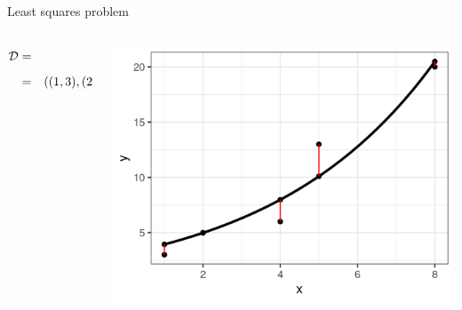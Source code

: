 \documentclass[11pt,compress,t,notes=noshow, xcolor=table]{beamer}
\begin{document}
\begin{vbframe}{Least squares problem}
\begin{columns}
\begin{column}{0.55\textwidth}
\begin{footnotesize}
\begin{eqnarray*}
\mathcal{D} &=& \left(\left(\mathbf{x}^{(i)}, y^{(i)}\right)\right)_{i = 1, ..., 5} \\ &=& \left((1,3),(2,7),(4,12),(5,13),(7,20)\right)
\end{eqnarray*}
\end{footnotesize}
\end{column}
\begin{column}{0.4\textwidth}
	\vspace*{-0.5cm}  
    \begin{center}
     \includegraphics[width=1\textwidth]{figure_man/squares.png}
     \end{center}
\end{column}
\end{columns}








\end{vbframe}
\end{document}
